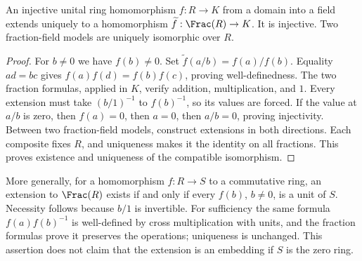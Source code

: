 \begin{theorem}\label{thm:fraction-field-universal}
An injective unital ring homomorphism $f:R\to K$ from a domain into a
field extends uniquely to a homomorphism
$\widetilde f:\Frac(R)\to K$. It is injective.
Two fraction-field models are uniquely isomorphic over $R$.
\end{theorem}
\begin{proof}
For $b\ne0$ we have $f(b)\ne0$. Set
$\widetilde f(a/b)=f(a)/f(b)$. Equality $ad=bc$ gives
$f(a)f(d)=f(b)f(c)$, proving well-definedness. The two fraction
formulas, applied in $K$, verify addition, multiplication, and $1$.
Every extension must take $(b/1)^{-1}$ to $f(b)^{-1}$, so its values
are forced. If the value at $a/b$ is zero, then $f(a)=0$, then $a=0$,
then $a/b=0$, proving injectivity. Between two fraction-field models,
construct extensions in both directions. Each composite fixes $R$,
and uniqueness makes it the identity on all fractions. This proves
existence and uniqueness of the compatible isomorphism.
\end{proof}
More generally, for a homomorphism $f:R\to S$ to a commutative ring,
an extension to $\Frac(R)$ exists if and only if every $f(b)$,
$b\ne0$, is a unit of $S$. Necessity follows because $b/1$ is
invertible. For sufficiency the same formula $f(a)f(b)^{-1}$ is
well-defined by cross multiplication with units, and the fraction
formulas prove it preserves the operations; uniqueness is unchanged.
This assertion does not claim that the extension is an embedding if
$S$ is the zero ring.
